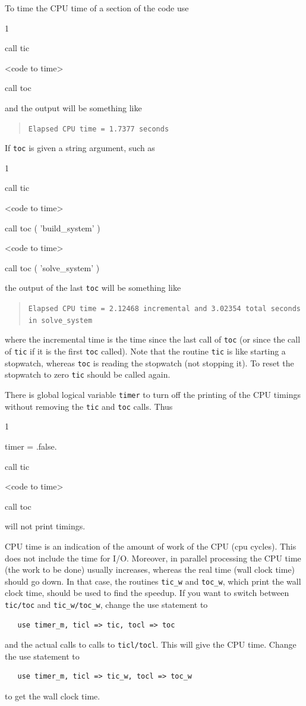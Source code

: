 To time the CPU time of a section of the code use
\begin{listing}{1}

  call tic

  <code to time>

  call toc

\end{listing}
and the output will be something like
\begin{quote}
   \texttt{Elapsed CPU time = 1.7377 seconds}
\end{quote}
If \texttt{toc} is given a string argument, such as
\begin{listing}{1}

  call tic

  <code to time>

  call toc ( 'build_system' )

  <code to time>

  call toc ( 'solve_system' )

\end{listing}
the output of the last \texttt{toc} will be something like
\begin{quote}
\texttt{Elapsed CPU time = 2.12468 incremental and 3.02354 total seconds
           in solve\_system}
\end{quote}
where the incremental time is the time since the last call of \texttt{toc}
(or since the call of \texttt{tic} if it is the first \texttt{toc} called).
Note that the routine \texttt{tic} is like starting a stopwatch, whereas
\texttt{toc} is reading the stopwatch (not stopping it). To reset the stopwatch
to zero \texttt{tic} should be called again.

There is global logical variable \texttt{timer}
to turn off the printing of the CPU timings without removing the
\texttt{tic} and \texttt{toc} calls. Thus
\begin{listing}{1}

  timer = .false.

  call tic

  <code to time>

  call toc

\end{listing}
will not print timings.

CPU time is an indication of the amount of work of the CPU (cpu cycles). This does not include the time for I/O. Moreover, in parallel processing the CPU time (the work to be done) usually increases, whereas the real time (wall clock time) should go down. In that case, the routines \texttt{tic\_w} and \texttt{toc\_w}, which print the wall clock time, should be used to find the speedup. If you want to switch between \texttt{tic/toc} and \texttt{tic\_w/toc\_w}, change the use statement to
\begin{verbatim}
   use timer_m, ticl => tic, tocl => toc
\end{verbatim}
and the actual calls to calls to \texttt{ticl/tocl}. This will give the CPU time. Change the use statement to
\begin{verbatim}
   use timer_m, ticl => tic_w, tocl => toc_w
\end{verbatim}
to get the wall clock time.

